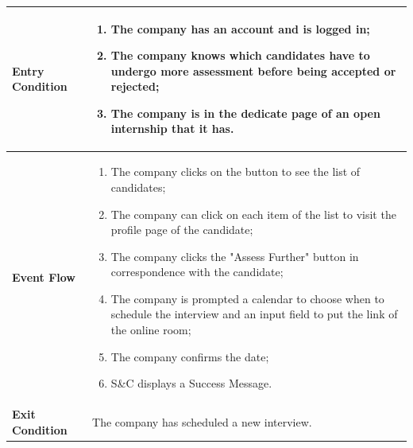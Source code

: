 \begin{enumerate}[label=\textbf{[US\arabic*]}, left = 0pt, align = left, resume]
\begin{longtable}{|l|p{11cm}|}
                \textbf{Entry Condition} & 
                    \begin{enumerate}[label=\textbullet, itemsep=0em]
                        \item The company has an account and is logged in;
                        \item The company knows which candidates have to undergo more assessment before being accepted or rejected;
                        \item The company is in the dedicate page of an open internship that it has.
                    \end{enumerate} \\
                \hline
                
                \textbf{Event Flow} &
                    \begin{enumerate}[label=\arabic*., itemsep=0.2em]
                        \item The company clicks on the button to see the list of candidates;
                        \item The company can click on each item of the list to visit the profile page of the candidate;
                        \item The company clicks the "Assess Further" button in correspondence with the candidate;
                        \item The company is prompted a calendar to choose when to schedule the interview and an input field to put the link of the online room;
                        \item The company confirms the date;
                        \item S\&C displays a Success Message.
                    \end{enumerate} \\
                \hline
                
                \textbf{Exit Condition} & 
                    The company has scheduled a new interview. \\
                \hline
                

\end{longtable}
\end{enumerate}
